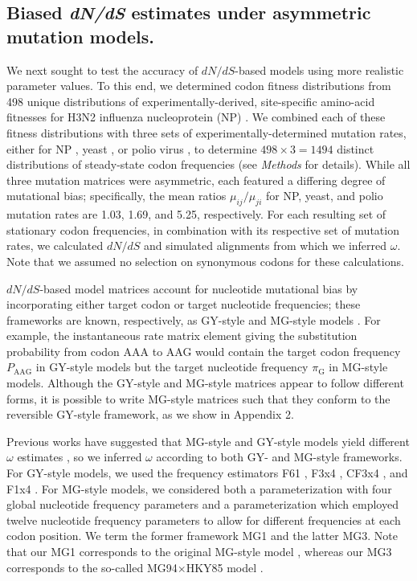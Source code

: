 \documentclass[11pt]{article}
\begin{document}
\subsection*{Biased \emph{dN/dS} estimates under asymmetric mutation models.}
We next sought to test the accuracy of $dN/dS$-based models using more realistic parameter values. To this end, we determined codon fitness distributions from 498 unique distributions of experimentally-derived, site-specific amino-acid fitnesses for H3N2 influenza nucleoprotein (NP) \citep{Bloom2014a}. We combined each of these fitness distributions with three sets of experimentally-determined mutation rates, either for NP \citep{Bloom2014a}, yeast \citep{Zhu2014}, or polio virus \citep{Acevedo2014}, to determine $498 \times 3 = 1494$ distinct distributions of steady-state codon frequencies (see \emph{Methods} for details). While all three mutation matrices were asymmetric, each featured a differing degree of mutational bias; specifically, the mean ratios $\mu_{ij} / \mu_{ji}$ for NP, yeast, and polio mutation rates are 1.03, 1.69, and 5.25, respectively. For each resulting set of stationary codon frequencies, in combination with its respective set of mutation rates, we calculated $dN/dS$ and simulated alignments from which we inferred $\omega$. Note that we assumed no selection on synonymous codons for these calculations.

$dN/dS$-based model matrices account for nucleotide mutational bias by incorporating either target codon \citep{GoldmanYang1994} or target nucleotide \citep{MuseGaut1994} frequencies; these frameworks are known, respectively, as GY-style and MG-style models \citep{KosakovskyPond2010}. For example, the instantaneous rate matrix element giving the substitution probability from codon AAA to AAG would contain the target codon frequency $P_\text{AAG}$ in GY-style models but the target nucleotide frequency $\pi_\text{G}$ in MG-style models. Although the GY-style and MG-style matrices appear to follow different forms, it is possible to write MG-style matrices such that they conform to the reversible GY-style framework, as we show in Appendix 2.

Previous works have suggested that MG-style and GY-style models yield different $\omega$ estimates \citep{KosakovskyPondMuse2005,Yap2010}, so we inferred $\omega$ according to both GY- and MG-style frameworks. For GY-style models, we used the frequency estimators F61 \citep{GoldmanYang1994}, F3x4 \citep{GoldmanYang1994}, CF3x4 \citep{KosakovskyPond2010}, and F1x4 \citep{MuseGaut1994}. For MG-style models, we considered both a parameterization with four global nucleotide frequency parameters and a parameterization which employed twelve nucleotide frequency parameters to allow for different frequencies at each codon position. We term the former framework MG1 and the latter MG3. Note that our MG1 corresponds to the original MG-style model \citep{MuseGaut1994}, whereas our MG3 corresponds to the so-called MG94$\times$HKY85 model \citep{KosakovskyPondMuse2005}. 
\end{document}

